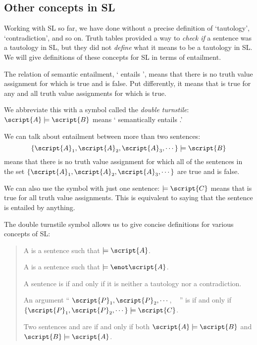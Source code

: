 \subsection{Other concepts in SL}

Working with SL so far, we have done without a precise definition of `tautology', `contradiction', and so on. Truth tables provided a way to \emph{check if} a sentence was a tautology in SL, but they did not \emph{define} what it means to be a tautology in SL. We will give definitions of these concepts for SL in terms of entailment.

The relation of semantic entailment, ` entails ', means that there is no truth value assignment for which  is true and  is false. Put differently, it means that  is true for any and all truth value assignments for which  is true.

We abbreviate this with a symbol called the \emph{double turnstile}:
$\script{A}\models\script{B}$ means ` semantically entails .'

We can talk about entailment between more than two sentences: $$\{\script{A}_1,\script{A}_2,\script{A}_3,\cdots\}\models\script{B}$$ means that there is no truth value assignment for which all of the sentences in the set $\{\script{A}_1,\script{A}_2,\script{A}_3,\cdots\}$ are true and  is false.

We can also use the symbol with just one sentence: $\models\script{C}$ means that  is true for all truth value assignments. This is equivalent to saying that the sentence is entailed by anything.

The double turnstile symbol allows us to give concise definitions for various concepts of SL:



\begin{quote}
A  is a sentence   such that $\models\script{A}$.

A  is a sentence  such that $\models\enot\script{A}$.

A sentence is  if and only if it is neither a tautology nor a contradiction.

An argument `` $\script{P}_1, \script{P}_2, \cdots$, \therefore\  '' is  if and only if $\{\script{P}_1,\script{P}_2,\cdots\}\models\script{C}$.

Two sentences  and  are  if and only if both $\script{A}\models\script{B}$ and $\script{B}\models\script{A}$.
\end{quote}

